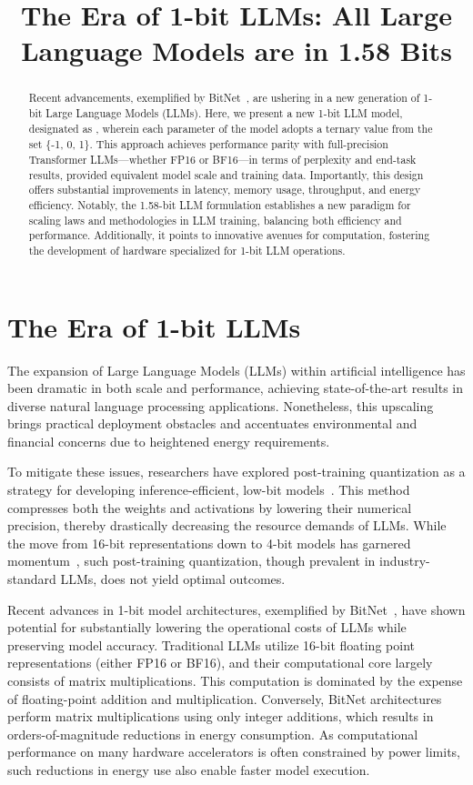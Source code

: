 \title{The Era of 1-bit LLMs: All Large Language Models are in 1.58 Bits}

\begin{abstract}
Recent advancements, exemplified by BitNet~\cite{bitnet}, are ushering in a new generation of 1-bit Large Language Models (LLMs). Here, we present a new 1-bit LLM model, designated as \textbf{}, wherein each parameter of the model adopts a ternary value from the set \{-1, 0, 1\}. This approach achieves performance parity with full-precision Transformer LLMs—whether FP16 or BF16—in terms of perplexity and end-task results, provided equivalent model scale and training data. Importantly, this design offers substantial improvements in latency, memory usage, throughput, and energy efficiency. Notably, the 1.58-bit LLM formulation establishes a new paradigm for scaling laws and methodologies in LLM training, balancing both efficiency and performance. Additionally, it points to innovative avenues for computation, fostering the development of hardware specialized for 1-bit LLM operations.
\end{abstract}

\section{The Era of 1-bit LLMs}

The expansion of Large Language Models (LLMs) within artificial intelligence has been dramatic in both scale and performance, achieving state-of-the-art results in diverse natural language processing applications. Nonetheless, this upscaling brings practical deployment obstacles and accentuates environmental and financial concerns due to heightened energy requirements.

To mitigate these issues, researchers have explored post-training quantization as a strategy for developing inference-efficient, low-bit models~\cite{smoothquant, gptq, quip, quip_sharp}. This method compresses both the weights and activations by lowering their numerical precision, thereby drastically decreasing the resource demands of LLMs. While the move from 16-bit representations down to 4-bit models has garnered momentum~\cite{gptq, awq}, such post-training quantization, though prevalent in industry-standard LLMs, does not yield optimal outcomes.

Recent advances in 1-bit model architectures, exemplified by BitNet~\cite{bitnet}, have shown potential for substantially lowering the operational costs of LLMs while preserving model accuracy. Traditional LLMs utilize 16-bit floating point representations (either FP16 or BF16), and their computational core largely consists of matrix multiplications. This computation is dominated by the expense of floating-point addition and multiplication. Conversely, BitNet architectures perform matrix multiplications using only integer additions, which results in orders-of-magnitude reductions in energy consumption. As computational performance on many hardware accelerators is often constrained by power limits, such reductions in energy use also enable faster model execution.

